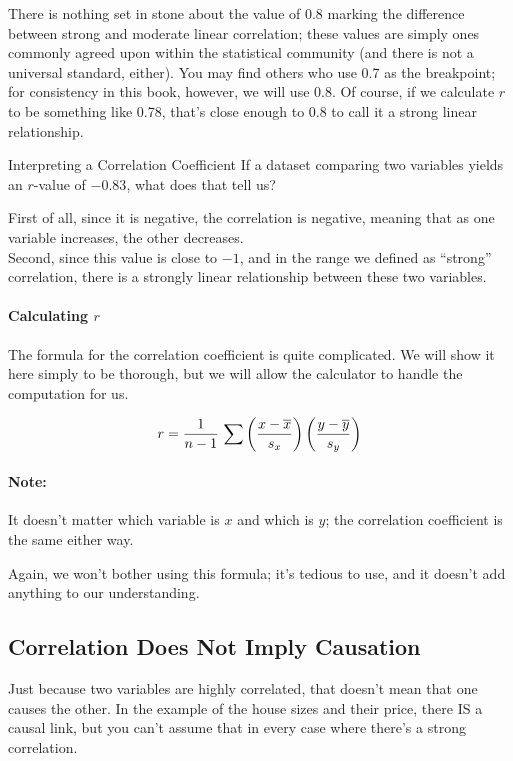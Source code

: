 There is nothing set in stone about the value of 0.8 marking the difference between strong and moderate linear correlation; these values are simply ones commonly agreed upon within the statistical community (and there is not a universal standard, either).  You may find others who use 0.7 as the breakpoint; for consistency in this book, however, we will use 0.8.  Of course, if we calculate $r$ to be something like 0.78, that's close enough to 0.8 to call it a strong linear relationship.
\pagebreak

\begin{example}{Interpreting a Correlation Coefficient}
If a dataset comparing two variables yields an $r$-value of $-0.83$, what does that tell us?

\sol
First of all, since it is negative, the correlation is negative, meaning that as one variable increases, the other decreases.\\

Second, since this value is close to $-1$, and in the range we defined as ``strong'' correlation, there is a strongly linear relationship between these two variables.
\end{example}

\paragraph{Calculating $r$} The formula for the correlation coefficient is quite complicated.  We will show it here simply to be thorough, but we will allow the calculator to handle the computation for us.

\[r=\dfrac{1}{n-1}\ \Large{\sum} \left(\dfrac{x-\overline{x}}{s_x}\right) \left(\dfrac{y-\overline{y}}{s_y}\right)\]

\paragraph{Note:} It doesn't matter which variable is $x$ and which is $y$; the correlation coefficient is the same either way.

Again, we won't bother using this formula; it's tedious to use, and it doesn't add anything to our understanding.

\subsection{Correlation Does Not Imply Causation}
Just because two variables are highly correlated, that doesn't mean that one causes the other.  In the example of the house sizes and their price, there IS a causal link, but you can't assume that in every case where there's a strong correlation.

